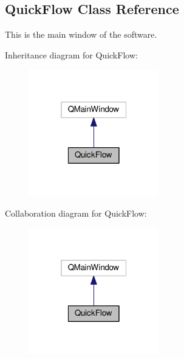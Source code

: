 \hypertarget{class_quick_flow}{}\subsection{Quick\+Flow Class Reference}
\label{class_quick_flow}


This is the main window of the software.  




Inheritance diagram for Quick\+Flow\+:\nopagebreak
\begin{figure}[H]
\begin{center}
\leavevmode
\includegraphics[width=160pt]{class_quick_flow__inherit__graph}
\end{center}
\end{figure}


Collaboration diagram for Quick\+Flow\+:\nopagebreak
\begin{figure}[H]
\begin{center}
\leavevmode
\includegraphics[width=160pt]{class_quick_flow__coll__graph}
\end{center}
\end{figure}
